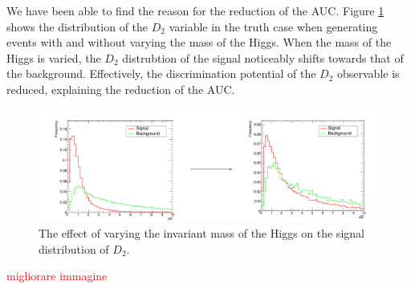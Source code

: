 \documentclass[10pt,a4paper]{book}
\newcommand\todo[1]{\textcolor{red}{#1}}
\begin{document}
We have been able to find the reason for the reduction of the AUC. Figure \ref{d2 inv mass} shows the distribution of the $D_2$ variable in the truth case when generating events with and without varying the mass of the Higgs. When the mass of the Higgs is varied, the $D_2$ distrubtion of the signal noticeably shifts towards that of the background. Effectively, the discrimination potential of the $D_2$ observable is reduced, explaining the reduction of the AUC.

\begin{figure}
\centering
\includegraphics[scale=0.3]{ch4_images/d2_inv_mass}
\caption{The effect of varying the invariant mass of the Higgs on the signal distribution of $D_2$.}
\label{d2 inv mass}
\end{figure}

\todo{migliorare immagine}

\end{document}
